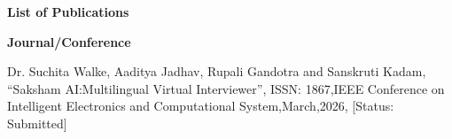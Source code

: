 \documentclass[12pt]{article}
\begin{document}
\setcounter{page}{52}

{\LARGE \textbf{List of Publications}}

\vspace{0.4cm}

\hspace{1cm}\textbf{Journal/Conference}

\vspace{10pt}

\noindent
\hspace{1.5cm}
\begin{minipage}{0.9\textwidth}
Dr. Suchita Walke, Aaditya Jadhav, Rupali Gandotra and Sanskruti Kadam,
``Saksham AI:Multilingual Virtual Interviewer'',
ISSN: 1867,IEEE Conference on Intelligent Electronics and Computational System,March,2026,
[Status: Submitted]
\end{minipage}
\end{document}
